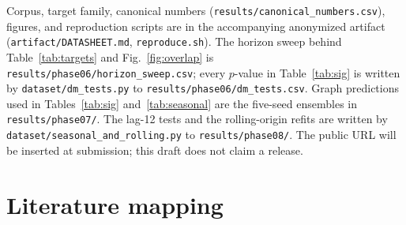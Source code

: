 \documentclass[10pt]{article}
\begin{document}
Corpus, target family, canonical numbers (\texttt{results/canonical\_numbers.csv}), figures, and reproduction scripts are in the accompanying anonymized artifact (\texttt{artifact/DATASHEET.md}, \texttt{reproduce.sh}). The horizon sweep behind Table~\ref{tab:targets} and Fig.~\ref{fig:overlap} is \texttt{results/phase06/horizon\_sweep.csv}; every $p$-value in Table~\ref{tab:sig} is written by \texttt{dataset/dm\_tests.py} to \texttt{results/phase06/dm\_tests.csv}. Graph predictions used in Tables~\ref{tab:sig} and~\ref{tab:seasonal} are the five-seed ensembles in \texttt{results/phase07/}. The lag-12 tests and the rolling-origin refits are written by \texttt{dataset/seasonal\_and\_rolling.py} to \texttt{results/phase08/}. The public URL will be inserted at submission; this draft does not claim a release.

\clearpage
\appendix
\section{Literature mapping}
\label{app:lit}
\end{document}
